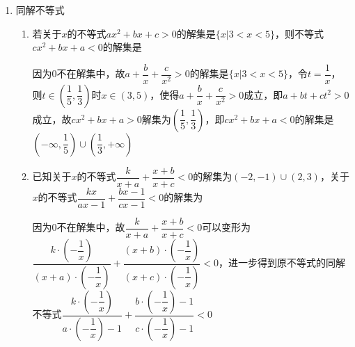 \begin{enumerate}
\begin{enumerate}
        \item 若关于$x$的不等式$ax^2-2ax+2a+3>0 (a \neq 0)$无实数解，则$a$的取值范围是\blkda{$(-\infty, -3]$}
        \begin{jieda}
            $a \neq 0$，应有$a < 0$，否则对应的二次函数开口向上必然有实数解. 此时应有$\Delta = 4a^2 - 4a(2a+3) = -4a^2 - 12a \leq 0$，解得$a \in (-\infty, -3] \cup [0, +\infty)$. 综上，$a \in (-\infty, -3]$
        \end{jieda}
        \item 若关于$x$的不等式$2x-1 > a(x-2)$的解集是$\mathbf{R}$，则实数$a$的取值范围是
        \begin{jieda}
            问题转化为直线$y = 2x-1$恒在直线$y = a(x-2)$上方，当且仅当两直线平行时满足要求，即$a = 2$.
        \end{jieda}
    \end{enumerate}
    \item 同解不等式
    \begin{enumerate}
        \item 若关于$x$的不等式$ax^2+bx+c > 0$的解集是$\{x|3<x<5\}$，则不等式$cx^2+bx+a<0$的解集是
        \begin{jieda}
            因为$0$不在解集中，故$a+\dfrac{b}{x}+\dfrac{c}{x^2} > 0$的解集是$\{x|3<x<5\}$，令$t = \dfrac{1}{x}$，则$t \in \left(\dfrac{1}{5}, \dfrac{1}{3}\right)$时$x \in (3, 5)$，使得$a+\dfrac{b}{x}+\dfrac{c}{x^2} > 0$成立，即$a+bt+ct^2 > 0$成立，故$cx^2+bx+a>0$解集为$\left(\dfrac{1}{5}, \dfrac{1}{3}\right)$，即$cx^2+bx+a<0$的解集是$\left(-\infty, \dfrac{1}{5}\right) \cup \left(\dfrac{1}{3}, +\infty\right)$
        \end{jieda}
        \item 已知关于$x$的不等式$\dfrac{k}{x+a} + \dfrac{x+b}{x+c} < 0$的解集为$(-2, -1) \cup (2, 3)$，关于$x$的不等式$\dfrac{kx}{ax-1} + \dfrac{bx-1}{cx-1} < 0$的解集为
        \begin{jieda}
            因为$0$不在解集中，故$\dfrac{k}{x+a} + \dfrac{x+b}{x+c} < 0$可以变形为$\dfrac{k\cdot\left(-\dfrac{1}{x}\right)}{(x+a)\cdot\left(-\dfrac{1}{x}\right)} + \dfrac{(x+b)\cdot\left(-\dfrac{1}{x}\right)}{(x+c)\cdot\left(-\dfrac{1}{x}\right)} < 0$，进一步得到原不等式的同解不等式$\dfrac{k\cdot\left(-\dfrac{1}{x}\right)}{a\cdot\left(-\dfrac{1}{x}\right) - 1} + \dfrac{b\cdot\left(-\dfrac{1}{x}\right) - 1}{c\cdot\left(-\dfrac{1}{x}\right) - 1} < 0$ \\

\end{jieda}
\end{enumerate}
\end{enumerate}
